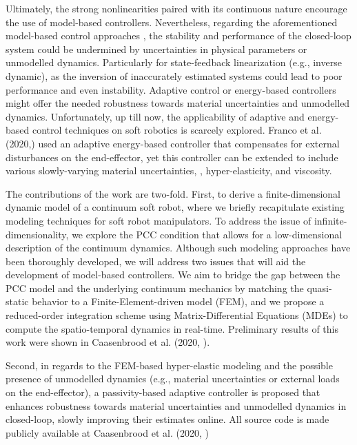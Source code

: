 Ultimately, the strong nonlinearities paired with its continuous nature encourage the use of model-based controllers. Nevertheless, regarding the aforementioned model-based control approaches \cite{DellaSantina2020,Katzschmann2019,Falkenhahn2015}, the stability and performance of the closed-loop system could be undermined by uncertainties in physical parameters or unmodelled dynamics. Particularly for state-feedback linearization (e.g., inverse dynamic), as the inversion of inaccurately estimated systems could lead to poor performance and even instability. Adaptive control \cite{Slotine1988,Morgan1977} or energy-based controllers \cite{Ortega1998} might offer the needed robustness towards material uncertainties and unmodelled dynamics. Unfortunately, up till now, the applicability of adaptive and energy-based control techniques on soft robotics is scarcely explored. Franco et al. (2020,\cite{Franco2020}) used an adaptive energy-based controller that compensates for external disturbances on the end-effector, yet this controller can be extended to include various slowly-varying material uncertainties, \eg, hyper-elasticity, and viscosity.

The contributions of the work are two-fold. First, to derive a finite-dimensional dynamic model of a continuum soft robot, where we briefly recapitulate existing modeling techniques for soft robot manipulators. To address the issue of infinite-dimensionality, we explore the PCC condition that allows for a low-dimensional description of the continuum dynamics. Although such modeling approaches have been thoroughly developed, we will address two issues that will aid the development of model-based controllers. We aim to bridge the gap between the PCC model and the underlying continuum mechanics by matching the quasi-static behavior to a Finite-Element-driven model (FEM), and we propose a reduced-order integration scheme using Matrix-Differential Equations (MDEs) to compute the spatio-temporal dynamics in real-time. Preliminary results of this work were shown in Caasenbrood et al. (2020, \cite{Caasenbrood2020}).
%

Second, in regards to the FEM-based hyper-elastic modeling and the possible presence of unmodelled dynamics (e.g., material uncertainties or external loads on the end-effector), a passivity-based adaptive controller is proposed that enhances robustness towards material uncertainties and unmodelled dynamics in closed-loop, slowly improving their estimates online. All source code is made publicly available at Caasenbrood et al. (2020, \cite{SorotokiCode}) 

